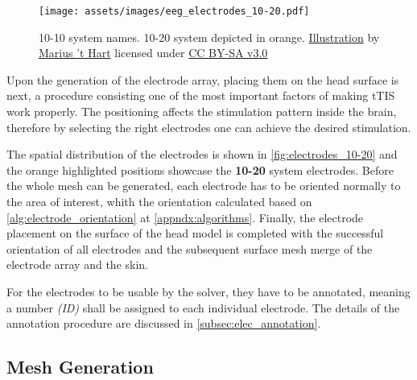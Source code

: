 \begin{wrapfigure}{l}{0.48\textwidth}
    \centering
    \vspace{-15pt}
    \texttt{[image: assets/images/eeg\_electrodes\_10-20.pdf]}
    \caption[10-10 system names. The orange electrodes are used in the 10-20 system.]{10-10 system names. 10-20 system depicted in orange. \href{http://www.mariusthart.net/downloads/eeg_electrodes_10-20.svg}{Illustration} by \href{http://www.beteredingen.nl}{Marius 't Hart} licensed under \href{http://creativecommons.org/licenses/by-sa/3.0/nl/deed.en_GB}{CC BY-SA v3.0}}
    \label{fig:electrodes_10-20}
\end{wrapfigure}

Upon the generation of the electrode array, placing them on the head surface is next, a procedure consisting one of the most important factors of making \gls{tTIS} work properly. The positioning affects the stimulation pattern inside the brain, therefore by selecting the right electrodes one can achieve the desired stimulation.

The spatial distribution of the electrodes is shown in \autoref{fig:electrodes_10-20} and the orange highlighted positions showcase the \textbf{10-20} system electrodes. Before the whole mesh can be generated, each electrode has to be oriented normally to the area of interest, whith the orientation calculated based on \autoref{alg:electrode_orientation} at \autoref{appndx:algorithms}. Finally, the electrode placement on the surface of the head model is completed with the successful orientation of all electrodes and the subsequent surface mesh merge of the electrode array and the skin.

For the electrodes to be usable by the solver, they have to be annotated, meaning a number \textit{(ID)} shall be assigned to each individual electrode. The details of the annotation procedure are discussed in \ref{subsec:elec_annotation}.

\subsection{Mesh Generation}
\label{subsec:mesh_generation}

